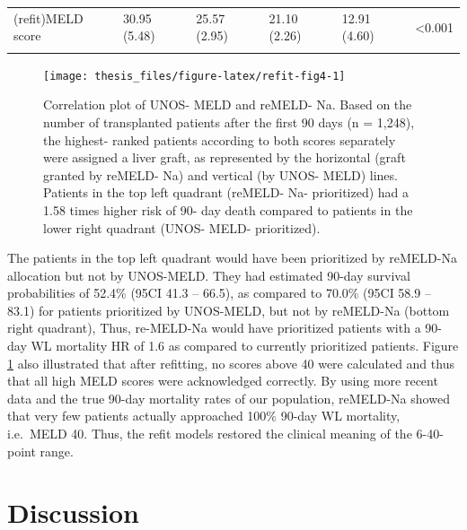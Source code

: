 \documentclass[11pt,english,]{book} %
\begin{document}
\begin{landscape}
\begin{table}
{\begin{tabular}[t]{llllll}
(refit)MELD score & 30.95 (5.48) & 25.57 (2.95) & 21.10 (2.26) & 12.91 (4.60) & <0.001\\
\cellcolor{gray!6}{Dialysis dependent (\%)} & \cellcolor{gray!6}{165 ( 15.3)} & \cellcolor{gray!6}{21 ( 15.1)} & \cellcolor{gray!6}{0 (  0.0)} & \cellcolor{gray!6}{87 (  1.6)} & \cellcolor{gray!6}{<0.001}\\
\bottomrule
\end{tabular}}
\end{table}
\end{landscape}

\linespread{1.213}

\begin{figure}[!h]

{\centering \texttt{[image: thesis\_files/figure-latex/refit-fig4-1]} 

}

\caption{Correlation plot of UNOS- MELD and reMELD- Na. Based on the number of transplanted patients after the first 90 days (n = 1,248), the highest- ranked patients according to both scores separately were assigned a liver graft, as represented by the horizontal (graft granted by reMELD- Na) and vertical (by UNOS- MELD) lines. Patients in the top left quadrant (reMELD- Na- prioritized) had a 1.58 times higher risk of 90- day death compared to patients in the lower right quadrant (UNOS- MELD- prioritized).}\label{fig:refit-fig4}
\end{figure}

The patients in the top left quadrant would have been prioritized by reMELD-Na allocation but not by UNOS-MELD. They had estimated 90-day survival probabilities of 52.4\% (95CI 41.3 -- 66.5), as compared to 70.0\% (95CI 58.9 -- 83.1) for patients prioritized by UNOS-MELD, but not by reMELD-Na (bottom right quadrant), Thus, re-MELD-Na would have prioritized patients with a 90-day WL mortality HR of 1.6 as compared to currently prioritized patients. Figure \ref{fig:refit-fig4} also illustrated that after refitting, no scores above 40 were calculated and thus that all high MELD scores were acknowledged correctly. By using more recent data and the true 90-day mortality rates of our population, reMELD-Na showed that very few patients actually approached 100\% 90-day WL mortality, i.e.~MELD 40. Thus, the refit models restored the clinical meaning of the 6-40-point range.

\hypertarget{discussion-1}{%
\section*{Discussion}\label{discussion-1}}
\end{document}
